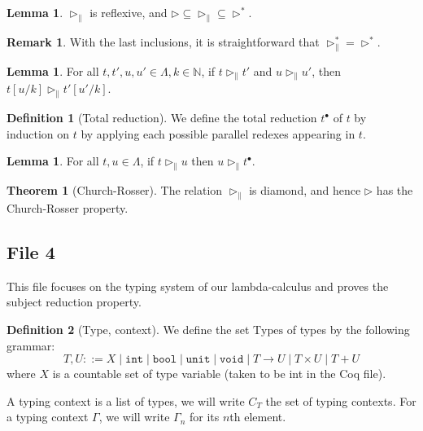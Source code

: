 \documentclass{article}
\renewcommand{\int}[0]{\texttt{int}}
\newcommand{\bool}[0]{\texttt{bool}}
\newcommand{\unit}[0]{\texttt{unit}}
\newcommand{\void}[0]{\texttt{void}}
\newcommand{\bN}[0]{\mathbb N}
\newcommand{\Types}[0]{\mathrm{Types}}
\theoremstyle{definition}
\newtheorem{defi}{Definition}
\newtheorem{them}{Theorem}
\newtheorem{lem}[prop]{Lemma}
\newtheorem*{rmk}{Remark}
\begin{document}
\begin{lem}
    $\rhd_\|$ is reflexive, and $\rhd\subseteq \rhd_\|\subseteq \rhd^*$.
\end{lem}

\begin{rmk}
    With the last inclusions, it is straightforward that $\rhd_\|^* = \rhd^*$.
\end{rmk}

\begin{lem}
    For all $t,t',u,u'\in\Lambda,k\in\bN$, if $t\rhd_\| t'$ and $u\rhd_\| u'$, then $t[u/k]\rhd_\| t'[u'/k]$.
\end{lem}

\begin{defi}[Total reduction]
    We define the total reduction $t^\bullet$ of $t$ by induction on $t$ by applying each possible parallel
    redexes appearing in $t$.
\end{defi}

\begin{lem}
    For all $t,u\in\Lambda$, if $t\rhd_\| u$ then $u\rhd_\| t^\bullet$.
\end{lem}

\begin{them}[Church-Rosser]
    The relation $\rhd_\|$ is diamond, and hence $\rhd$ has the Church-Rosser property.
\end{them}

\subsection{File 4}

This file focuses on the typing system of our lambda-calculus and proves the subject reduction property.

\begin{defi}[Type, context]
    We define the set $\Types$ of types by the following grammar:
    $$T,U ::= X \mid \int\mid\bool\mid\unit\mid\void\mid T \to U \mid T \times U \mid T + U$$
    where $X$ is a countable set of type variable (taken to be int in the Coq file).

    A typing context is a list of types, we will write $C_T$ the set of typing contexts. For a typing context
    $\Gamma$, we will write $\Gamma_n$ for its $n$th element.
\end{defi}
\end{document}

